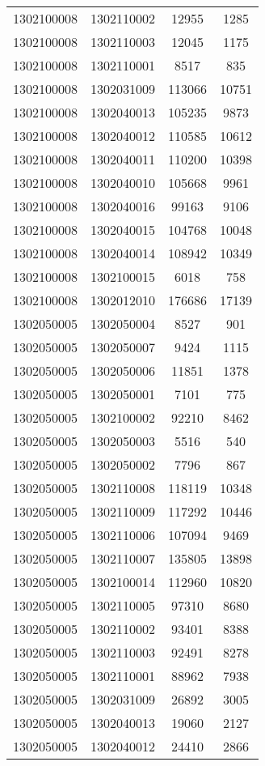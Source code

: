 \begin{longtable}{llcc}
1302100008 & 1302110002 & 12955 & 1285\\
1302100008 & 1302110003 & 12045 & 1175\\
1302100008 & 1302110001 & 8517 & 835\\
1302100008 & 1302031009 & 113066 & 10751\\
1302100008 & 1302040013 & 105235 & 9873\\
1302100008 & 1302040012 & 110585 & 10612\\
1302100008 & 1302040011 & 110200 & 10398\\
1302100008 & 1302040010 & 105668 & 9961\\
1302100008 & 1302040016 & 99163 & 9106\\
1302100008 & 1302040015 & 104768 & 10048\\
1302100008 & 1302040014 & 108942 & 10349\\
1302100008 & 1302100015 & 6018 & 758\\
1302100008 & 1302012010 & 176686 & 17139\\
1302050005 & 1302050004 & 8527 & 901\\
1302050005 & 1302050007 & 9424 & 1115\\
1302050005 & 1302050006 & 11851 & 1378\\
1302050005 & 1302050001 & 7101 & 775\\
1302050005 & 1302100002 & 92210 & 8462\\
1302050005 & 1302050003 & 5516 & 540\\
1302050005 & 1302050002 & 7796 & 867\\
1302050005 & 1302110008 & 118119 & 10348\\
1302050005 & 1302110009 & 117292 & 10446\\
1302050005 & 1302110006 & 107094 & 9469\\
1302050005 & 1302110007 & 135805 & 13898\\
1302050005 & 1302100014 & 112960 & 10820\\
1302050005 & 1302110005 & 97310 & 8680\\
1302050005 & 1302110002 & 93401 & 8388\\
1302050005 & 1302110003 & 92491 & 8278\\
1302050005 & 1302110001 & 88962 & 7938\\
1302050005 & 1302031009 & 26892 & 3005\\
1302050005 & 1302040013 & 19060 & 2127\\
1302050005 & 1302040012 & 24410 & 2866\\

\end{longtable}
